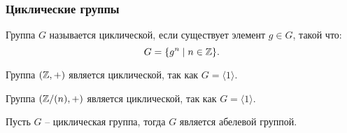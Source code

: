 \subsubsection{Циклические группы}
\begin{definition}
    Группа $G$ называется циклической, если существует элемент $g \in G$, такой что:
    \[
        G = \{g^n \mid n \in \mathbb Z\}.
    \]
\end{definition}
\begin{example}
    Группа $(\mathbb Z, +)$ является циклической, так как $G = \langle 1 \rangle$.
\end{example}
\begin{example}
    Группа $(\mathbb Z/{(n)}, +)$ является циклической, так как $G = \langle 1 \rangle$.
\end{example}
\begin{theorem}
    Пусть $G$ -- циклическая группа, тогда $G$ является абелевой группой. \end{theorem}
